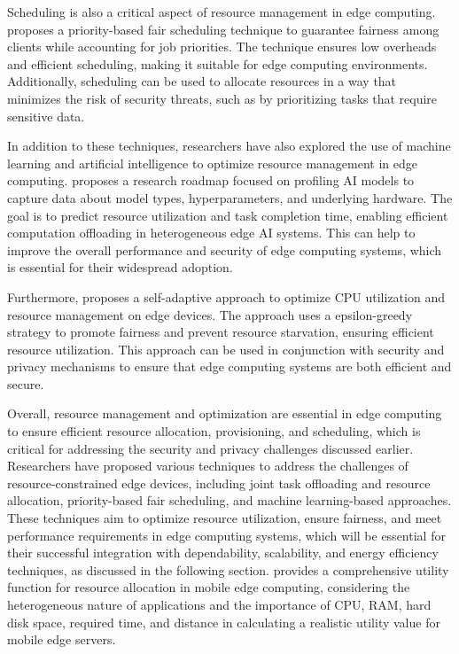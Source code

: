 \documentclass[11pt]{article}
\begin{document}
Scheduling is also a critical aspect of resource management in edge computing. \cite{ref73} proposes a priority-based fair scheduling technique to guarantee fairness among clients while accounting for job priorities. The technique ensures low overheads and efficient scheduling, making it suitable for edge computing environments. Additionally, scheduling can be used to allocate resources in a way that minimizes the risk of security threats, such as by prioritizing tasks that require sensitive data.

In addition to these techniques, researchers have also explored the use of machine learning and artificial intelligence to optimize resource management in edge computing. \cite{ref74} proposes a research roadmap focused on profiling AI models to capture data about model types, hyperparameters, and underlying hardware. The goal is to predict resource utilization and task completion time, enabling efficient computation offloading in heterogeneous edge AI systems. This can help to improve the overall performance and security of edge computing systems, which is essential for their widespread adoption.

Furthermore, \cite{ref75} proposes a self-adaptive approach to optimize CPU utilization and resource management on edge devices. The approach uses a epsilon-greedy strategy to promote fairness and prevent resource starvation, ensuring efficient resource utilization. This approach can be used in conjunction with security and privacy mechanisms to ensure that edge computing systems are both efficient and secure.

Overall, resource management and optimization are essential in edge computing to ensure efficient resource allocation, provisioning, and scheduling, which is critical for addressing the security and privacy challenges discussed earlier. Researchers have proposed various techniques to address the challenges of resource-constrained edge devices, including joint task offloading and resource allocation, priority-based fair scheduling, and machine learning-based approaches. These techniques aim to optimize resource utilization, ensure fairness, and meet performance requirements in edge computing systems, which will be essential for their successful integration with dependability, scalability, and energy efficiency techniques, as discussed in the following section. \cite{ref76} provides a comprehensive utility function for resource allocation in mobile edge computing, considering the heterogeneous nature of applications and the importance of CPU, RAM, hard disk space, required time, and distance in calculating a realistic utility value for mobile edge servers.
\end{document}
